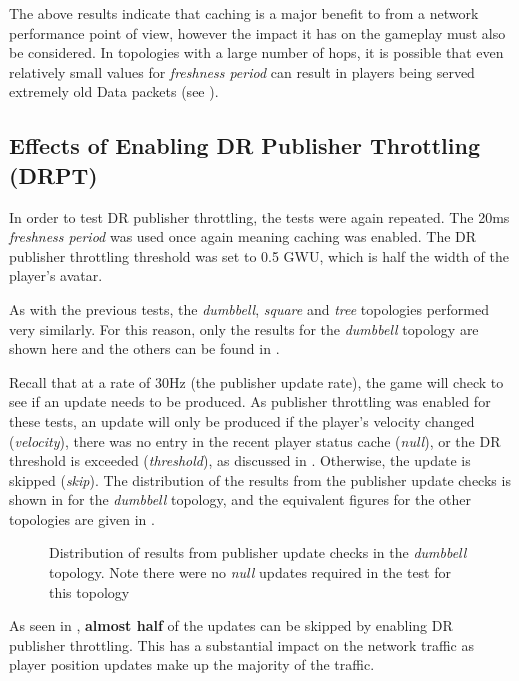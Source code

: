 The above results indicate that caching is a major benefit to \game{} from a network performance point of view, however the impact it has on the gameplay must also be considered. In topologies with a large number of hops, it is possible that even relatively small values for \textit{freshness period} can result in players being served extremely old Data packets (see ).


\subsection{Effects of Enabling DR Publisher Throttling (DRPT)}
In order to test DR publisher throttling, the tests were again repeated. The 20ms \textit{freshness period} was used once again meaning caching was enabled. The DR publisher throttling threshold was set to 0.5 GWU, which is half the width of the player's avatar. 

As with the previous tests, the \textit{dumbbell}, \textit{square} and \textit{tree} topologies performed very similarly. For this reason, only the results for the \textit{dumbbell} topology are shown here and the others can be found in .

Recall that at a rate of 30Hz (the publisher update rate), the game will check to see if an update needs to be produced. As publisher throttling was enabled for these tests, an update will only be produced if the player's velocity changed (\textit{velocity}), there was no entry in the recent player status cache (\textit{null}), or the DR threshold is exceeded (\textit{threshold}), as discussed in . Otherwise, the update is skipped (\textit{skip}). The distribution of the results from the publisher update checks is shown in  for the \textit{dumbbell} topology, and the equivalent figures for the other topologies are given in .

\begin{figure}[H]
    \centering
    \caption{Distribution of results from publisher update checks in the \textit{dumbbell} topology. Note there were no \textit{null} updates required in the test for this topology}
    \label{fig:eval:caching:dr-pub-throt:counters:dumbbell}
\end{figure}

As seen in , \textbf{almost half} of the updates can be skipped by enabling DR publisher throttling. This has a substantial impact on the network traffic as player position updates make up the majority of the traffic.

